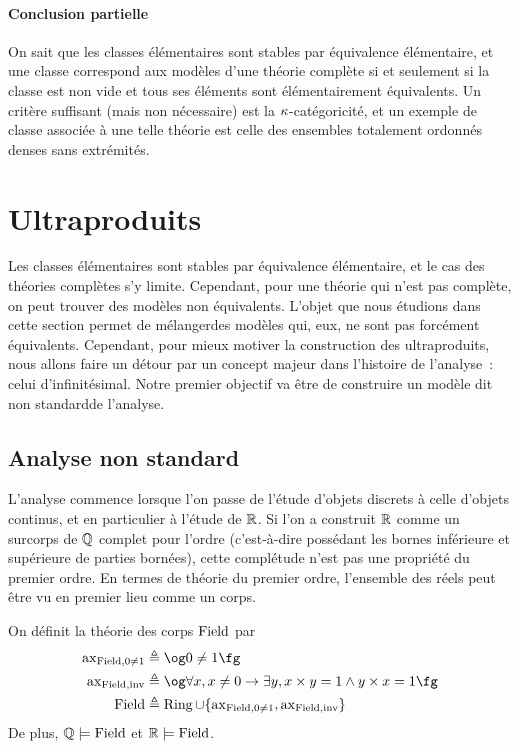 \paragraph{Conclusion partielle}
On sait que les classes élémentaires sont stables par équivalence élémentaire,
et une classe correspond aux modèles d'une théorie complète si et seulement si
la classe est non vide et tous ses éléments sont élémentairement équivalents.
Un critère suffisant (mais non nécessaire) est la $\kappa$-catégoricité, et un
exemple de classe associée à une telle théorie est celle des ensembles
totalement ordonnés denses sans extrémités.

\section{Ultraproduits}

Les classes élémentaires sont stables par équivalence élémentaire, et le cas
des théories complètes s'y limite. Cependant, pour une théorie qui n'est pas
complète, on peut trouver des modèles non équivalents. L'objet que nous
étudions dans cette section permet de \og mélanger\fg des modèles qui, eux,
ne sont pas forcément équivalents. Cependant, pour mieux motiver la construction
des ultraproduits, nous allons faire un détour par un concept majeur dans
l'histoire de l'analyse~: celui d'infinitésimal. Notre premier objectif va être
de construire un modèle dit \og non standard\fg de l'analyse.

\subsection{Analyse non standard}

L'analyse commence lorsque l'on passe de l'étude d'objets discrets à celle
d'objets continus, et en particulier à l'étude de $\mathbb R$. Si l'on a construit
$\mathbb R$ comme un surcorps de $\mathbb Q$ complet pour l'ordre (c'est-à-dire possédant
les bornes inférieure et supérieure de parties bornées), cette complétude n'est
pas une propriété du premier ordre. En termes de théorie du premier ordre,
l'ensemble des réels peut être vu en premier lieu comme un corps.

\begin{definition}
  On définit la théorie des corps $\operatorname{Field}$ par
  \begin{align*}
    \Rax_{\Field,0\neq 1} &\defeq \ogM 0 \neq 1\fgM\\
    \Rax_{\Field,\inv} &\defeq \ogM\forall x, x \neq 0 \to
    \exists y, x\times y = 1 \land y \times x = 1\fgM\\
    \Field&\defeq \Ring\cup\{\Rax_{\Field,0\neq 1},\Rax_{\Field,\inv}\}
  \end{align*}
  De plus, $\mathbb Q\models\operatorname{Field}$ et $\mathbb R\models\operatorname{Field}$.
\end{definition}

